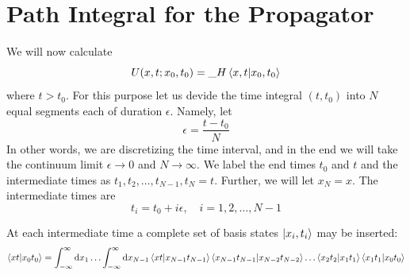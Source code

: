 	\section{Path Integral for the Propagator}
		We will now calculate
		\begin{equation}
			U(x,t;x_0, t_0) = {\_H}\braket{x,t}{x_0, t_0}
			\label{chapter12.eqn1-propagator-path-integral}
		\end{equation}
		where $t>t_0$. For this purpose let us devide the time integral $(t,t_0)$ into $N$ equal segments each of duration $\epsilon$. Namely, let
		\begin{equation}
			\epsilon = \frac{t-t_0}{N}
			\label{chapter12.eqn2-propagator-path-integral}
		\end{equation}
		In other words, we are discretizing the time interval, and in the end we will take the continuum limit $\epsilon\rightarrow 0$ and $N\rightarrow \infty$. We label the end times $t_0$ and $t$ and the intermediate times as $t_1, t_2, \ldots, t_{N-1}, t_N=t$. Further, we will let $x_N=x$. The intermediate times are 
		\begin{equation}
			t_i=t_0+i \epsilon, \quad i=1,2,\ldots,N-1
			\label{chapter12.eqn3-propagator-path-integral}
		\end{equation}
		
		At each intermediate time a complete set of basis states $\ket{x_i,t_i}$ may be inserted:
		\begin{equation}
			\braket{x t}{x_0 t_0} =\int_{-\infty}^{\infty}\dd{x_1} \ldots \int_{-\infty}^{\infty} \dd{x_{N-1}} \braket{x t}{x_{N-1} t_{N-1}}\braket{x_{N-1} t_{N-1}}{x_{N-2} t_{N-2}} \ldots \braket{x_2 t_2}{x_{1} t_{1}} \braket{x_1 t_1}{x_{0} t_{0}}
			\label{chapter12.eqn4-propagator-path-integral}
		\end{equation}
		
